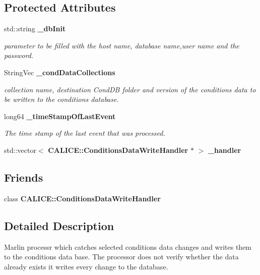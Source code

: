\subsection*{Protected Attributes}
\begin{DoxyCompactItemize}
\item 
std::string {\bf \_\-dbInit}
\begin{DoxyCompactList}\small\item\em parameter to be filled with the host name, database name,user name and the password. \item\end{DoxyCompactList}\item 
StringVec {\bf \_\-condDataCollections}
\begin{DoxyCompactList}\small\item\em collection name, destination CondDB folder and version of the conditions data to be written to the conditions database. \item\end{DoxyCompactList}\item 
long64 {\bf \_\-timeStampOfLastEvent}
\begin{DoxyCompactList}\small\item\em The time stamp of the last event that was processed. \item\end{DoxyCompactList}\item 
std::vector$<$ {\bf CALICE::ConditionsDataWriteHandler} $\ast$ $>$ {\bfseries \_\-handler}\label{classmarlin_1_1ConditionsDataWriter_a68d96e4787ed480558b5b3088cd3321f}

\end{DoxyCompactItemize}
\subsection*{Friends}
\begin{DoxyCompactItemize}
\item 
class {\bf CALICE::ConditionsDataWriteHandler}\label{classmarlin_1_1ConditionsDataWriter_a0e401bb1bfedeba5808934499877adf4}

\end{DoxyCompactItemize}


\subsection{Detailed Description}
Marlin processr which catches selected conditions data changes and writes them to the conditions data base. The processor does not verify whether the data already exists it writes every change to the database.

